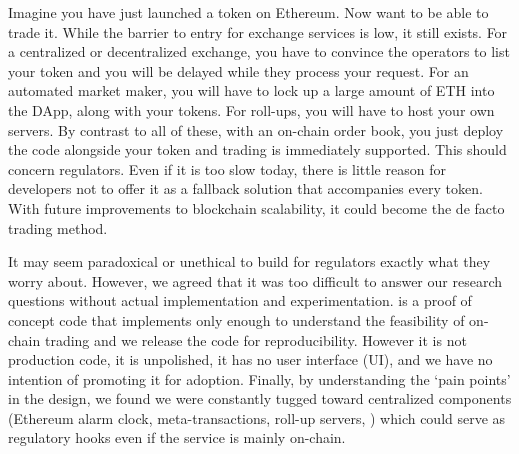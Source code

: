 Imagine you have just launched a token on Ethereum. Now want to be able to trade it. While the barrier to entry for exchange services is low, it still exists. For a centralized or decentralized exchange, you have to convince the operators to list your token and you will be delayed while they process your request. For an automated market maker, you will have to lock up a large amount of ETH into the DApp, along with your tokens. For roll-ups, you will have to host your own servers. By contrast to all of these, with an on-chain order book, you just deploy the code alongside your token and trading is immediately supported. This should concern regulators. Even if it is too slow today, there is little reason for developers not to offer it as a fallback solution that accompanies every token. With future improvements to blockchain scalability, it could become the de facto trading method.

It may seem paradoxical or unethical to build for regulators exactly what they worry about. However, we agreed that it was too difficult to answer our research questions without actual implementation and experimentation. \cm is a proof of concept code that implements only enough to understand the feasibility of on-chain trading and we release the code for reproducibility. However it is not production code, it is unpolished, it has no user interface (UI), and we have no intention of promoting it for adoption. Finally, by understanding the `pain points' in the design, we found we were constantly tugged toward centralized components (Ethereum alarm clock, meta-transactions, roll-up servers, \etc) which could serve as regulatory hooks even if the service is mainly on-chain.





